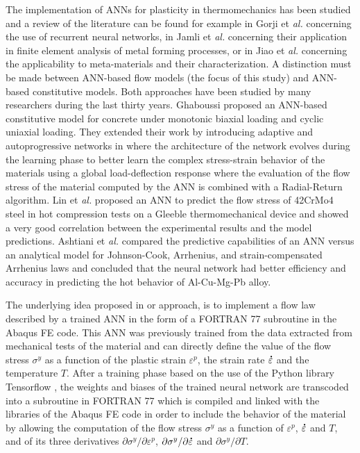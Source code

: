 \documentclass[algorithms,article,submit,pdftex,moreauthors]{Definitions/mdpi}
\makeatletter
\DeclareRobustCommand{\mdot}[1]{\accentset{\mbox{\bfseries .}}{#1}}
\DeclareRobustCommand{\eal}{et \emph{al.}\@\xspace}
\makeatother
\begin{document}
The implementation of ANNs for plasticity in thermomechanics has been studied and a review of the literature can be found for example in Gorji \eal \cite{Gorji-2020} concerning the use of recurrent neural networks, in Jamli \eal \cite{Jamli-2019-SNN} concerning their application in finite element analysis of metal forming processes, or in Jiao \eal \cite{Jiao-2020} concerning the applicability to meta-materials and their characterization.
A distinction must be made between ANN-based flow models (the focus of this study) and ANN-based constitutive models.
Both approaches have been studied by many researchers during the last thirty years.
Ghaboussi \cite{Ghaboussi-1991} proposed an ANN-based constitutive model for concrete under monotonic biaxial loading and cyclic uniaxial loading.
They extended their work by introducing adaptive and autoprogressive networks in \cite{Ghaboussi-1998, Ghaboussi-1998-NNA} where the architecture of the network evolves during the learning phase to better learn the complex stress-strain behavior of the materials using a global load-deflection response where the evaluation of the flow stress of the material computed by the ANN is combined with a Radial-Return algorithm.
Lin \eal \cite{Lin-2008} proposed an ANN to predict the flow stress of 42CrMo4 steel in hot compression tests on a Gleeble thermomechanical device and showed a very good correlation between the experimental results and the model predictions.
Ashtiani \eal \cite{Ashtiani-2016} compared the predictive capabilities of an ANN versus an analytical model for Johnson-Cook, Arrhenius, and strain-compensated Arrhenius laws and concluded that the neural network had better efficiency and accuracy in predicting the hot behavior of Al-Cu-Mg-Pb alloy.

The underlying idea proposed in or approach, is to implement a flow law described by a trained ANN in the form of a FORTRAN 77 subroutine in the Abaqus FE code.
This ANN was previously trained from the data extracted from mechanical tests of the material and can directly define the value of the flow stress $\sigma^y$ as a function of the plastic strain $\varepsilon^p$, the strain rate $\mdot\varepsilon$ and the temperature $T$.
After a training phase based on the use of the Python library Tensorflow \cite{Abadi-2016, Mattmann-2020}, the weights and biases of the trained neural network are transcoded into a subroutine in FORTRAN 77 which is compiled and linked with the libraries of the Abaqus FE code in order to include the behavior of the material by allowing the computation of the flow stress $\sigma^y$ as a function of $\varepsilon^p$, $\mdot\varepsilon$ and $T$, and of its three derivatives $\partial\sigma^y/\partial\varepsilon^p$, $\partial\sigma^y/\partial\mdot\varepsilon$ and $\partial\sigma^y/\partial T$.
\end{document}
